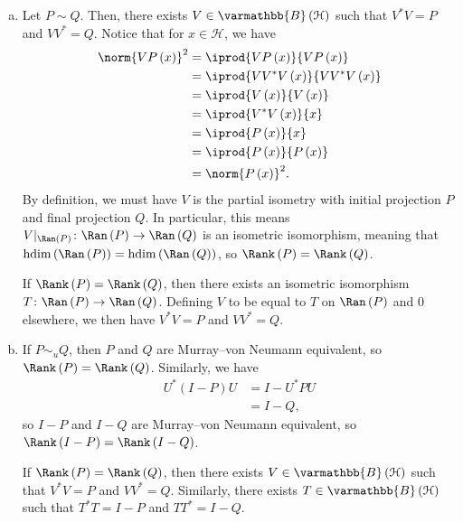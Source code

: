 \documentclass[10pt]{mypackage}
\renewcommand*{\mathbb}[1]{\varmathbb{#1}}
\DeclareMathOperator{\hdim}{hdim}
\newcommand{\B}{\mathbb{B}}
\begin{document}
\begin{solution}\hfill
  \begin{enumerate}[(a)]
    \item Let $P\sim Q$. Then, there exists $V\in \B\left(\mathcal{H}\right)$ such that $V^{\ast}V = P$ and $VV^{\ast} = Q$. Notice that for $x\in \mathcal{H}$, we have
      \begin{align*}
        \norm{VP\left(x\right)}^2 &= \iprod{VP\left(x\right)}{VP\left(x\right)}\\
                                  &= \iprod{VV^{\ast}V\left(x\right)}{VV^{\ast}V\left(x\right)}\\
                                  &= \iprod{V\left(x\right)}{V\left(x\right)}\\
                                  &= \iprod{V^{\ast}V\left(x\right)}{x}\\
                                  &= \iprod{P\left(x\right)}{x}\\
                                  &= \iprod{P\left(x\right)}{P\left(x\right)}\\
                                  &= \norm{P\left(x\right)}^2.
      \end{align*}
      By definition, we must have $V$ is the partial isometry with initial projection $P$ and final projection $Q$. In particular, this means $V|_{\Ran\left(P\right)}\colon \Ran\left(P\right)\rightarrow \Ran\left(Q\right)$ is an isometric isomorphism, meaning that $\hdim\left(\Ran\left(P\right)\right) =\hdim\left(\Ran\left(Q\right)\right)$, so $\Rank\left(P\right) = \Rank\left(Q\right)$.\newline

      If $\Rank\left(P\right) = \Rank\left(Q\right)$, then there exists an isometric isomorphism $T\colon \Ran\left(P\right)\rightarrow \Ran\left(Q\right)$. Defining $V$ to be equal to $T$ on $\Ran\left(P\right)$ and $0$ elsewhere, we then have $V^{\ast}V = P$ and $VV^{\ast} = Q$.
    \item If $P\sim_{u}Q$, then $P$ and $Q$ are Murray--von Neumann equivalent, so $\Rank\left(P\right) = \Rank\left(Q\right)$. Similarly, we have
      \begin{align*}
        U^{\ast}\left(I-P\right)U &= I-U^{\ast}PU\\
                                  &= I-Q,
      \end{align*}
      so $I-P$ and $I-Q$ are Murray--von Neumann equivalent, so $\Rank\left(I-P\right) = \Rank\left(I-Q\right)$.\newline

      If $\Rank\left(P\right) = \Rank\left(Q\right)$, then there exists $V\in \B\left(\mathcal{H}\right)$ such that $V^{\ast}V = P$ and $VV^{\ast} = Q$. Similarly, there exists $T\in \B\left(\mathcal{H}\right)$ such that $T^{\ast}T = I-P$ and $TT^{\ast} = I-Q$.
  \end{enumerate}
\end{solution}
\end{document}
